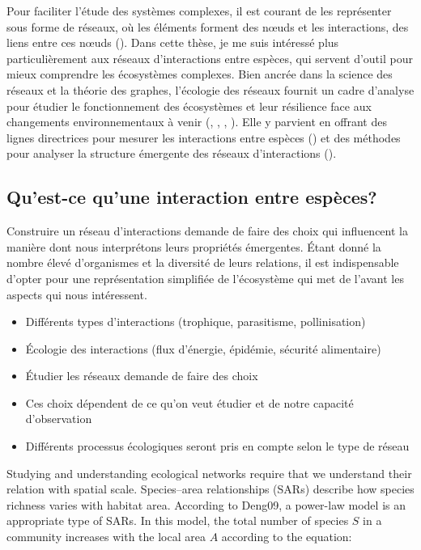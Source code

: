 Pour faciliter l'étude des systèmes complexes, il est courant de les représenter
sous forme de réseaux, où les éléments forment des nœuds et les interactions,
des liens entre ces nœuds (\cite{Newman2003Structure}). Dans cette thèse, je me
suis intéressé plus particulièrement aux réseaux d'interactions entre espèces,
qui servent d'outil pour mieux comprendre les écosystèmes complexes. Bien ancrée
dans la science des réseaux et la théorie des graphes, l'écologie des réseaux
fournit un cadre d'analyse pour étudier le fonctionnement des écosystèmes et
leur résilience face aux changements environnementaux à venir
(\cite{McCann2007Protecting}, \cite{McCann2011Food}, \cite{Proulx2005Network},
\cite{Rooney2012Integrating}). Elle y parvient en offrant des lignes directrices
pour mesurer les interactions entre espèces (\cite{Jordano2016Sampling}) et des
méthodes pour analyser la structure émergente des réseaux d'interactions
(\cite{Delmas2019Analysing}). 

\subsection{Qu'est-ce qu'une interaction entre espèces?} 

Construire un réseau d'interactions demande de faire des choix qui influencent
la manière dont nous interprétons leurs propriétés émergentes. Étant donné la
nombre élevé d'organismes et la diversité de leurs relations, il est
indispensable d'opter pour une représentation simplifiée de l'écosystème qui met
de l'avant les aspects qui nous intéressent. 

\begin{itemize}
    \item Différents types d'interactions (trophique, parasitisme, pollinisation)
    \item Écologie des interactions (flux d'énergie, épidémie, sécurité alimentaire)
    \item Étudier les réseaux demande de faire des choix 
    \item Ces choix dépendent de ce qu'on veut étudier et de notre capacité d'observation
    \item Différents processus écologiques seront pris en compte selon le type de réseau
\end{itemize}


Studying and understanding
ecological networks require that we understand their relation with spatial
scale.  Species–area relationships (SARs) describe how species richness varies
with habitat area. According to Deng09, a power-law model is an appropriate
type of SARs. In this model, the total number of species $S$ in a community
increases with the local area $A$ according to the equation:

